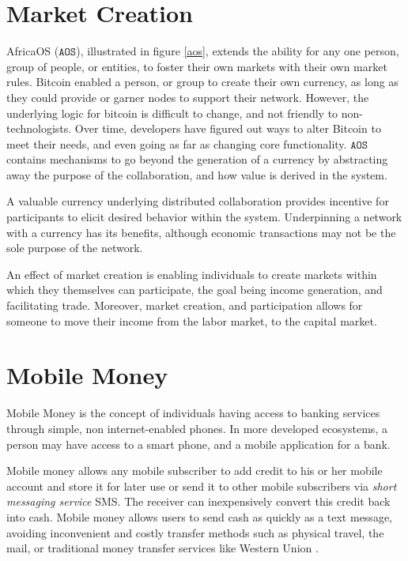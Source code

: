 \documentclass[10pt, titlepage, twocolumn]{report}
\begin{document}
\section{Market Creation}
\hspace*{15pt}
AfricaOS (\(\texttt{AOS}\)), illustrated in figure \ref{aos}, extends the ability for any one person, group of people, or entities, to foster their own markets with their own market rules. Bitcoin enabled a person, or group to create their own currency, as long as they could provide or garner nodes to support their network. However, the underlying logic for bitcoin is difficult to change, and not friendly to non-technologists. Over time, developers have figured out ways to alter Bitcoin to meet their needs, and even going as far as changing core functionality. \(\texttt{AOS}\) contains mechanisms to go beyond the generation of a currency by abstracting away the purpose of the collaboration, and how value is derived in the system. 


\hspace*{15pt}
A valuable currency underlying distributed collaboration provides incentive for participants to elicit desired behavior within the system. Underpinning a network with a currency has its benefits, although economic transactions may not be the sole purpose of the network.

\hspace*{15pt}
An effect of market creation is enabling individuals to create markets within which they themselves can participate, the goal being income generation, and facilitating trade. Moreover, market creation, and participation allows for someone to move their income from the labor market, to the capital market. 


\section{Mobile Money}
\hspace*{15pt}
Mobile Money \cite{MM} is the concept of individuals having access to banking services through simple, non internet-enabled phones. In more developed ecosystems, a person may have access to a smart phone, and a mobile application for a bank. 

\hspace*{15pt}
Mobile money allows any mobile subscriber to add credit to his or her mobile account and store it for later use or send it to other mobile subscribers via \textit{short messaging service} SMS. The receiver can inexpensively convert this credit back into cash. Mobile money allows users to send cash as quickly as a text message, avoiding inconvenient and costly transfer methods such as physical travel, the mail, or traditional money transfer services like Western Union \cite{MM}.
\end{document}
